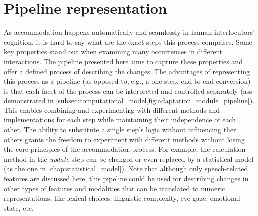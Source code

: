 \section{Pipeline representation}
\label{sec:pipeline_representation}

As accommodation happens automatically and seamlessly in human interlocutors' cognition, it is hard to say what are the exact steps this process comprises.
Some key properties stand out when examining many occurrences in different interactions.
The pipeline presented here aims to capture these properties and offer a defined process of describing the changes.
The advantages of representing this process as a pipeline (as opposed to, e.g., a one-step, end-to-end conversion) is that each facet of the process can be interpreted and controlled separately (ass demonstrated in \cref{subsec:computational_model,fig:adaptation_module_pipeline}).
This enables combining and experimenting with different methods and implementations for each step while maintaining their independence of each other.
The ability to substitute a single step's logic without influencing ther others grants the freedom to experiment with different methods without losing the core principles of the accommodation process.
For example, the calculation method in the \textit{update} step can be changed or even replaced by a statistical model (as the one in \cref{chap:statistical_model}).
Note that although only speech-related features are discussed here, this pipeline could be used for describing changes in other types of features and modalities that can be translated to numeric representations, like lexical choices, linguistic complexity, eye gaze, emotional state, etc.

